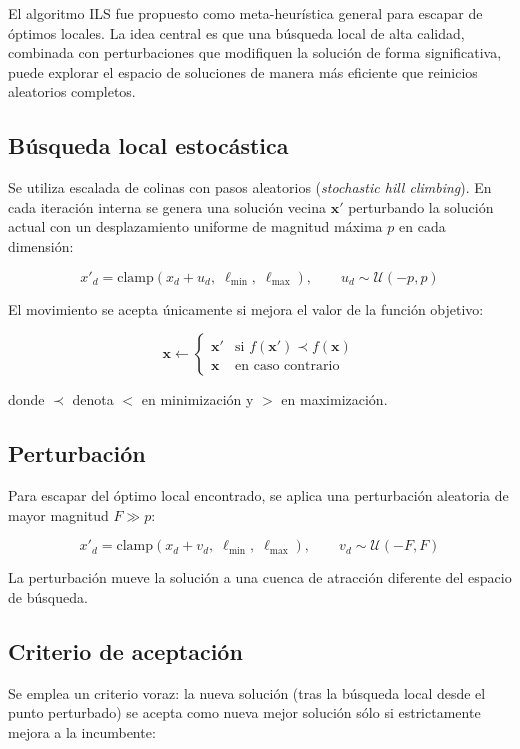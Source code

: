 \documentclass[11pt]{article}
\begin{document}
El algoritmo ILS fue propuesto como meta-heur\'istica general para escapar de \'optimos locales. La idea central es que una b\'usqueda local de alta calidad, combinada con perturbaciones que modifiquen la soluci\'on de forma significativa, puede explorar el espacio de soluciones de manera m\'as eficiente que reinicios aleatorios completos.

\subsection{B\'usqueda local estoc\'astica}

Se utiliza escalada de colinas con pasos aleatorios (\textit{stochastic hill climbing}). En cada iteraci\'on interna se genera una soluci\'on vecina $\mathbf{x}'$ perturbando la soluci\'on actual con un desplazamiento uniforme de magnitud m\'axima $p$ en cada dimensi\'on:

\[
x'_d = \text{clamp}\!\left(x_d + u_d,\; \ell_{\min},\; \ell_{\max}\right), \qquad u_d \sim \mathcal{U}(-p, p)
\]

El movimiento se acepta \'unicamente si mejora el valor de la funci\'on objetivo:

\[
\mathbf{x} \leftarrow
\begin{cases}
\mathbf{x}' & \text{si } f(\mathbf{x}') \prec f(\mathbf{x}) \\
\mathbf{x}  & \text{en caso contrario}
\end{cases}
\]

donde $\prec$ denota $<$ en minimizaci\'on y $>$ en maximizaci\'on.

\subsection{Perturbaci\'on}

Para escapar del \'optimo local encontrado, se aplica una perturbaci\'on aleatoria de mayor magnitud $F \gg p$:

\[
x'_d = \text{clamp}\!\left(x_d + v_d,\; \ell_{\min},\; \ell_{\max}\right), \qquad v_d \sim \mathcal{U}(-F, F)
\]

La perturbaci\'on mueve la soluci\'on a una cuenca de atracci\'on diferente del espacio de b\'usqueda.

\subsection{Criterio de aceptaci\'on}

Se emplea un criterio voraz: la nueva soluci\'on (tras la b\'usqueda local desde el punto perturbado) se acepta como nueva mejor soluci\'on s\'olo si estrictamente mejora a la incumbente:
\end{document}

